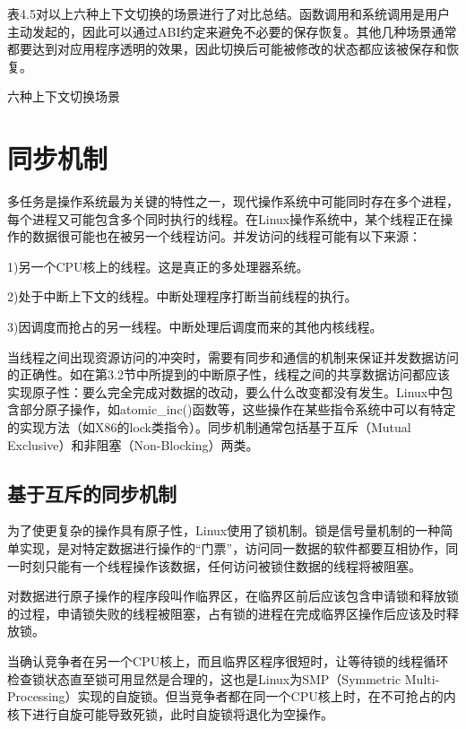 \documentclass[]{ctexbook}
\begin{document}
表4.5对以上六种上下文切换的场景进行了对比总结。函数调用和系统调用是用户主动发起的，因此可以通过ABI约定来避免不必要的保存恢复。其他几种场景通常都要达到对应用程序透明的效果，因此切换后可能被修改的状态都应该被保存和恢复。

\label{tab:context-switch}六种上下文切换场景

\hypertarget{ux540cux6b65ux673aux5236}{%
\section{同步机制}\label{ux540cux6b65ux673aux5236}}

多任务是操作系统最为关键的特性之一，现代操作系统中可能同时存在多个进程，每个进程又可能包含多个同时执行的线程。在Linux操作系统中，某个线程正在操作的数据很可能也在被另一个线程访问。并发访问的线程可能有以下来源：

1)另一个CPU核上的线程。这是真正的多处理器系统。

2)处于中断上下文的线程。中断处理程序打断当前线程的执行。

3)因调度而抢占的另一线程。中断处理后调度而来的其他内核线程。

当线程之间出现资源访问的冲突时，需要有同步和通信的机制来保证并发数据访问的正确性。如在第3.2节中所提到的中断原子性，线程之间的共享数据访问都应该实现原子性：要么完全完成对数据的改动，要么什么改变都没有发生。Linux中包含部分原子操作，如atomic\_inc()函数等，这些操作在某些指令系统中可以有特定的实现方法（如X86的lock类指令）。同步机制通常包括基于互斥（Mutual Exclusive）和非阻塞（Non-Blocking）两类。

\hypertarget{ux57faux4e8eux4e92ux65a5ux7684ux540cux6b65ux673aux5236}{%
\subsection{基于互斥的同步机制}\label{ux57faux4e8eux4e92ux65a5ux7684ux540cux6b65ux673aux5236}}

为了使更复杂的操作具有原子性，Linux使用了锁机制。锁是信号量机制的一种简单实现，是对特定数据进行操作的``门票''，访问同一数据的软件都要互相协作，同一时刻只能有一个线程操作该数据，任何访问被锁住数据的线程将被阻塞。

对数据进行原子操作的程序段叫作临界区，在临界区前后应该包含申请锁和释放锁的过程，申请锁失败的线程被阻塞，占有锁的进程在完成临界区操作后应该及时释放锁。

当确认竞争者在另一个CPU核上，而且临界区程序很短时，让等待锁的线程循环检查锁状态直至锁可用显然是合理的，这也是Linux为SMP（Symmetric Multi-Processing）实现的自旋锁。但当竞争者都在同一个CPU核上时，在不可抢占的内核下进行自旋可能导致死锁，此时自旋锁将退化为空操作。
\end{document}
